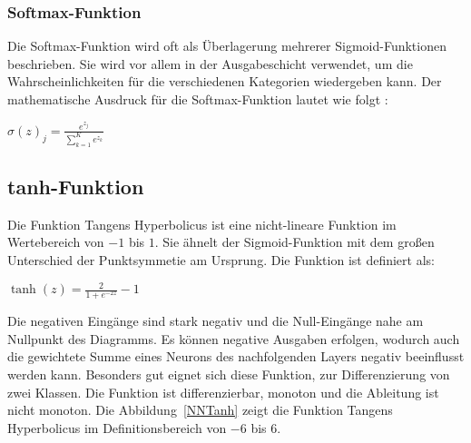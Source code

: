 \subsubsection{Softmax-Funktion}
Die Softmax-Funktion wird oft als Überlagerung mehrerer Sigmoid-Funktionen beschrieben. Sie wird vor allem in der Ausgabeschicht verwendet, 
um die Wahrscheinlichkeiten für die verschiedenen Kategorien wiedergeben kann. Der mathematische Ausdruck für die Softmax-Funktion
 lautet wie folgt \cite{Gupta:2020b}:

\begin{center}
$\sigma(z)_j = \frac{e^{z_j}}{\sum\nolimits_{k=1}^K e^{z_k}}$
\end{center}


\subsection{tanh-Funktion}%

Die Funktion Tangens Hyperbolicus ist eine nicht-lineare Funktion im Wertebereich von $-1$
bis $1$. Sie ähnelt der Sigmoid-Funktion mit dem großen Unterschied der Punktsymmetie
am Ursprung. Die Funktion ist definiert als:

\begin{center}
  $\tanh(z) = \frac{2}{1 + e^{-2z}} -1$
\end{center}

Die negativen Eingänge sind stark negativ und die Null-Eingänge nahe am Nullpunkt des
Diagramms. Es können negative Ausgaben erfolgen, wodurch auch die gewichtete Summe
eines Neurons des nachfolgenden Layers negativ beeinflusst werden kann. Besonders gut
eignet sich diese Funktion, zur Differenzierung von zwei Klassen. Die Funktion ist differenzierbar,
 monoton und die Ableitung ist nicht monoton. \cite{Gupta:2020b} Die Abbildung~\ref{NNTanh}
zeigt die Funktion Tangens Hyperbolicus im Definitionsbereich von $-6$ bis $6$.

